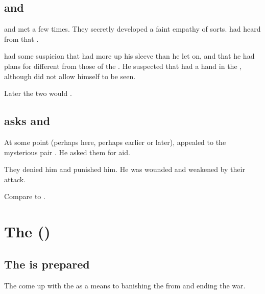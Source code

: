 \subsection{\Ishnaruchaefir and \Azraid}
\Ishnaruchaefir and \Azraid met a few times. 
They secretly developed a faint empathy of sorts.
\Ishnaruchaefir had heard from \Nexagglachel that . 

\Ishnaruchaefir had some suspicion that \Azraid had more up his sleeve than he let on, and that he had plans for \Miith different from those of the \banelords.
He suspected that \Azraid had a hand in the \Shrouding, although \Azraid did not allow himself to be seen. 

Later the two would . 









\subsection{\Ishnaruchaefir asks \Zaz and \Urzaz}
At some point (perhaps here, perhaps earlier or later), \Ishnaruchaefir appealed to the mysterious pair . 
He asked them for aid. 

They denied him and punished him.
He was wounded and weakened by their attack.

Compare to .














\section{The \SecondShrouding ()}
\subsection{The \SecondShrouding{} is prepared}
The \dragons{} come up with the \SecondShrouding{} as a means to banishing the \banelords{} from \Miith{} and ending the war.





